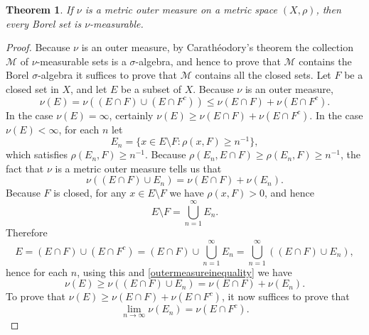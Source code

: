 \documentclass{article}
\newtheorem{theorem}{Theorem}
\theoremstyle{definition}
\begin{document}
\begin{theorem}
If $\nu$ is a metric outer measure on a metric space $(X,\rho)$, then every Borel set is $\nu$-measurable.
\label{sigmaalgebra}
\end{theorem}
\begin{proof}
Because $\nu$ is an outer measure, by Carath\'eodory's theorem the collection $\mathscr{M}$ of $\nu$-measurable sets is a $\sigma$-algebra, and hence
to prove that $\mathscr{M}$ contains the Borel $\sigma$-algebra it suffices to prove that $\mathscr{M}$
contains all the closed sets.
Let $F$ be a closed set in $X$, and let $E$ be a subset of $X$. Because $\nu$ is an outer measure, 
\[
\nu(E) = \nu((E \cap F) \cup (E \cap F^c)) \leq \nu(E \cap F) + \nu(E \cap F^c).
\]
In the case $\nu(E) = \infty$, certainly $\nu(E) \geq  \nu(E \cap F) + \nu(E \cap F^c)$. In the case $\nu(E) < \infty$, 
for each $n$ let 
\[
E_n = \{x \in E \setminus F : \rho(x,F) \geq n^{-1} \},
\]
which satisfies
$\rho(E_n,F) \geq n^{-1}$.
Because $\rho(E_n,E \cap F) \geq \rho(E_n,F) \geq n^{-1}$, the fact that $\nu$ is a metric outer measure tells us that
\begin{equation}
\nu((E \cap F) \cup E_n) = \nu(E\cap F) + \nu(E_n).
\label{outermeasureinequality}
\end{equation}
Because $F$ is closed, for any $x \in E \setminus F$ we have $\rho(x,F)>0$, and hence
\begin{equation}
E \setminus F = \bigcup_{n=1}^\infty E_n.
\label{union}
\end{equation}
Therefore
\[
E = (E \cap F) \cup (E \cap F^c) = (E \cap F) \cup  \bigcup_{n=1}^\infty E_n = \bigcup_{n=1}^\infty ((E \cap F) \cup E_n),
\]
hence for each $n$, using this and \eqref{outermeasureinequality} we have
\[
\nu(E) \geq \nu((E \cap F) \cup E_n)  =   \nu(E\cap F) + \nu(E_n).
\]
To prove that $\nu(E) \geq \nu(E \cap F) + \nu(E \cap F^c)$, it now suffices to prove that
\[
\lim_{n \to \infty} \nu(E_n) = \nu(E \cap F^c).
\] 


\end{proof}
\end{document}
